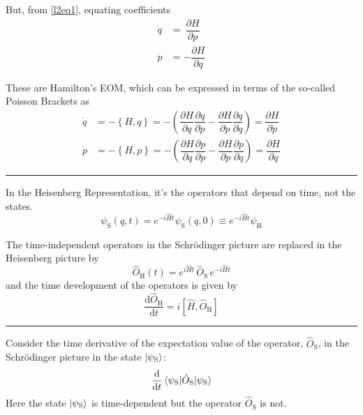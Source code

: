 \documentclass{article}
\begin{document}
\noindent But, from \eqref{l2eq1}, equating coefficients
\begin{align*}
    \dot{q} &= ~ \dfrac{ \partial H }{ \partial p } \\
    \dot{p} &= - \dfrac{ \partial H }{ \partial q }
\end{align*}

\noindent These are Hamilton's EOM, which can be expressed in terms of the so-called Poisson Brackets as
\begin{align*}
    \dot{q} &= - \left\lbrace H, q \right\rbrace = - \left( \dfrac{ \partial H }{ \partial q } \dfrac{ \partial q }{ \partial p } - \dfrac{ \partial H }{ \partial p } \dfrac{ \partial q }{ \partial q } \right) = \dfrac{ \partial H }{ \partial p } \\
    \dot{p} &= - \left\lbrace H, p \right\rbrace = - \left( \dfrac{ \partial H }{ \partial q } \dfrac{ \partial p }{ \partial p } - \dfrac{ \partial H }{ \partial p } \dfrac{ \partial p }{ \partial q } \right) = \dfrac{ \partial H }{ \partial q }
\end{align*}

\noindent\rule{\textwidth}{.5pt}


\noindent In the Heisenberg Representation, it's the operators that depend on time, not the states.
\begin{equation*}
    \psi_\mathrm{S} (q, t) = e^{ - i \hat{H} t } \psi_\mathrm{S} (q, 0) \equiv e^{ - i \hat{H} t } \psi_\mathrm{H}
\end{equation*}

\noindent The time-independent operators in the Schr\"{o}dinger picture are replaced in the Heisenberg picture by
\begin{equation*}
    \hat{O}_\mathrm{H} (t) = e^{ i \hat{H} t } \, \hat{O}_\mathrm{S} \, e^{ - i \hat{H} t }
\end{equation*}
and the time development of the operators is given by
\begin{equation*}
    \dfrac{ \mathrm{d} \hat{O}_\mathrm{H} }{ \mathrm{d} t } = i [ \hat{H}, \hat{O}_\mathrm{H} ]
\end{equation*}

\noindent\rule{\textwidth}{.5pt}


\noindent Consider the time derivative of the expectation value of the operator, $\hat{O}_\mathrm{S}$, in the Schr\"{o}dinger picture in the state $\ket{ \psi_\mathrm{S} }$:
\begin{equation} \label{l2eq7}
    \dfrac{\mathrm{d}}{ \mathrm{d} t } \braket{ \psi_\mathrm{S} | \hat{O}_\mathrm{S} | \psi_\mathrm{S} }
\end{equation} %
Here the state $\ket{ \psi_\mathrm{S} }$ is time-dependent but the operator $\hat{O}_\mathrm{S}$ is not.
\end{document}
